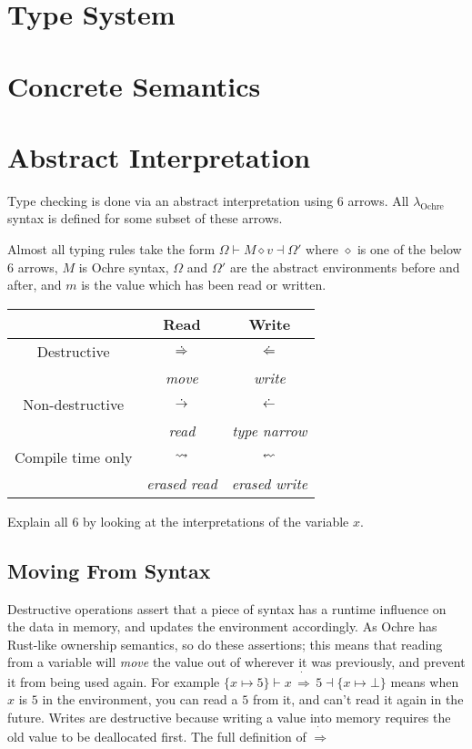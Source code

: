 \documentclass[12pt,twoside]{report}
\newcommand{\lochre}{$\lambda_\text{Ochre}$}
\begin{document}
\section{Type System}


\section{Concrete Semantics}


\section{Abstract Interpretation}
Type checking is done via an abstract interpretation using 6 arrows. All \lochre{} syntax is defined for some subset of these arrows.

Almost all typing rules take the form $\Omega \vdash M \diamond v \dashv \Omega'$ where $\diamond$ is one of the below 6 arrows, $M$ is Ochre syntax, $\Omega$ and $\Omega'$ are the abstract environments before and after, and $m$ is the value which has been read or written.

\begin{tabular}{c|c|c}
  & Read & Write \\
  \hline
  Destructive & $\,\dot{\Rightarrow}\,$ & $\,\dot{\Leftarrow}\,$ \\
  & \textit{move} & \textit{write}\\
  Non-destructive & $\,\dot{\rightarrow}\,$ & $\,\dot{\leftarrow}\,$ \\
  & \textit{read} & \textit{type narrow}\\
  Compile time only & $\,\rightsquigarrow\,$ &  $\erasedwritearrow$ \\
  & \textit{erased read} & \textit{erased write}\\
\end{tabular}

Explain all 6 by looking at the interpretations of the variable $x$.

\subsection{Moving From Syntax}
Destructive operations assert that a piece of syntax has a runtime influence on the data in memory, and updates the environment accordingly. As Ochre has Rust-like ownership semantics, so do these assertions; this means that reading from a variable will \textit{move} the value out of wherever it was previously, and prevent it from being used again. For example $\{x \mapsto 5\} \vdash x\,\dot{\Rightarrow}\,5 \dashv \{x \mapsto \bot\}$ means when $x$ is $5$ in the environment, you can read a $5$ from it, and can't read it again in the future. Writes are destructive because writing a value into memory requires the old value to be deallocated first. The full definition of $\dot{\Rightarrow}$
\end{document}
